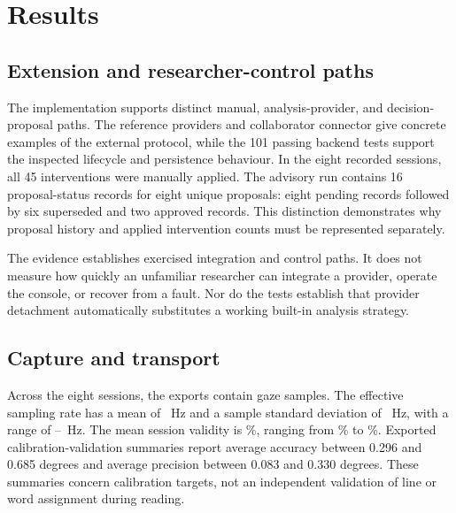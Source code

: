 \section{Results}
\label{sec:results}

\subsection{Extension and researcher-control paths}

The implementation supports distinct manual, analysis-provider, and decision-proposal paths. The reference providers and collaborator connector give concrete examples of the external protocol, while the 101 passing backend tests support the inspected lifecycle and persistence behaviour. In the eight recorded sessions, all 45 interventions were manually applied. The advisory run contains 16 proposal-status records for eight unique proposals: eight pending records followed by six superseded and two approved records. This distinction demonstrates why proposal history and applied intervention counts must be represented separately.

The evidence establishes exercised integration and control paths. It does not measure how quickly an unfamiliar researcher can integrate a provider, operate the console, or recover from a fault. Nor do the tests establish that provider detachment automatically substitutes a working built-in analysis strategy.

\subsection{Capture and transport}

Across the eight sessions, the exports contain \gazeTotal{} gaze samples. The effective sampling rate has a mean of \gazeMeanHz{}~Hz and a sample standard deviation of \gazeSdHz{}~Hz, with a range of \gazeMinHz{}--\gazeMaxHz{}~Hz. The mean session validity is \gazeMeanValid{}\%, ranging from \gazeMinValid{}\% to \gazeMaxValid{}\%. Exported calibration-validation summaries report average accuracy between 0.296 and 0.685 degrees and average precision between 0.083 and 0.330 degrees. These summaries concern calibration targets, not an independent validation of line or word assignment during reading.

\begin{table}[t]
\caption{Observed timing endpoints in milliseconds. $n$ counts diagnostic samples or matched exchanges, not participants. The advisory run is a separate recording. Freshness ends at context dispatch; none of these rows measures complete gaze-to-display latency.}
\label{tab:timing}
\centering

\end{table}

